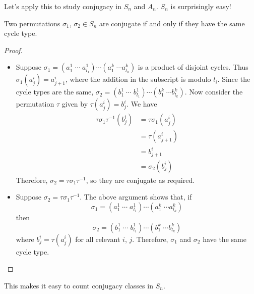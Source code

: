 \documentclass{../template/note}
\begin{document}
    Let's apply this to study conjugacy in \(S_n\) and \(A_n\). \(S_n\) is surprisingly easy!

    \begin{theorem}[Conjugacy in \(S_n\)]
        Two permutations \(\sigma_1\), \(\sigma_2 \in S_n\) are conjugate if and only if they have the same cycle type.
        \label{conjugacy-sn}
    \end{theorem}
    
    \begin{proof}
        \begin{itemize}
            \item[\(\implies\)] Suppose \(\sigma_1 = (a_1^1 \; \cdots \; a_{l_1}^1)\cdots (a_1^k \; \cdots a_{l_k}^k)\) is a product of disjoint cycles. Thus \(\sigma_1(a_j^i) = a_{j+1}^i\), where the addition in the subscript is modulo \(l_i\). Since the cycle types are the same, \(\sigma_2 = (b_1^1 \; \cdots \; b_{l_1}^1)\cdots (b_1^k \; \cdots b_{l_k}^k)\). Now consider the permutation \(\tau\) given by \(\tau(a_j^i) = b_j^i\). We have
            \begin{align*}
                \tau \sigma_1 \tau^{-1}(b_j^i) &= \tau\sigma_1(a_j^i) \\
                &= \tau(a^i_{j+1}) \\
                &= b^i_{j+1} \\
                &= \sigma_2(b^i_j)
            \end{align*}
            Therefore, \(\sigma_2 = \tau\sigma_1\tau^{-1}\), so they are conjugate as required.
        \end{itemize}
        \begin{itemize}
            \item[\(\impliedby\)] Suppose \(\sigma_2 = \tau\sigma_1\tau^{-1}\). The above argument shows that, if
            \[
                \sigma_1 = (a_1^1 \; \cdots \; a_{l_1}^1)\cdots (a_1^k \; \cdots a_{l_k}^k)
            \]
            then
            \[
                \sigma_2 = (b_1^1 \; \cdots \; b_{l_1}^1)\cdots (b_1^k \; \cdots b_{l_k}^k)
            \]
            where \(b_j^i = \tau(a_j^i)\) for all relevant \(i\), \(j\). Therefore, \(\sigma_1\) and \(\sigma_2\) have the same cycle type.
        \end{itemize}
    \end{proof}
    
    This makes it easy to count conjugacy classes in \(S_n\).
\end{document}
